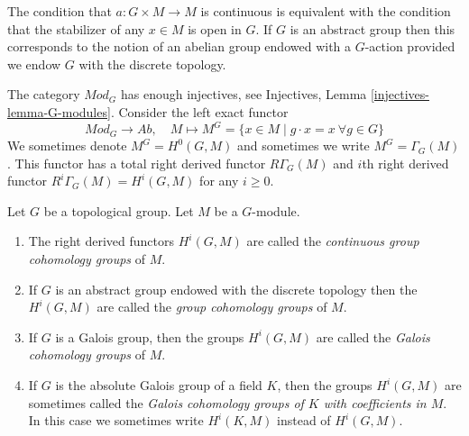 \noindent
The condition that $a : G \times M \to M$ is continuous is equivalent
with the condition that the stabilizer of any  $x \in M$ is open in $G$.
If $G$ is an abstract group then this corresponds to the notion of an
abelian group endowed with a $G$-action provided we endow $G$ with the
discrete topology.

\medskip\noindent
The category $\textit{Mod}_G$ has enough injectives, see
Injectives, Lemma \ref{injectives-lemma-G-modules}.
Consider the left exact functor
$$
\textit{Mod}_G \longrightarrow \textit{Ab},
\quad
M \longmapsto M^G =
\{x \in M \mid g \cdot x = x\ \forall g \in G\}
$$
We sometimes denote $M^G = H^0(G, M)$ and sometimes we write
$M^G = \Gamma_G(M)$. This functor has a total right derived functor
$R\Gamma_G(M)$ and $i$th right derived functor
$R^i\Gamma_G(M) = H^i(G, M)$ for any $i \geq 0$.

\begin{definition}
\label{definition-galois-cohomology}
Let $G$ be a topological group. Let $M$ be a $G$-module.
\begin{enumerate}
\item The right derived functors $H^i(G, M)$ are called the
{\it continuous group cohomology groups} of $M$.
\item If $G$ is an abstract group endowed with the discrete topology
then the $H^i(G, M)$ are called the {\it group cohomology groups} of $M$.
\item If $G$ is a Galois group, then the groups $H^i(G, M)$ are called
the {\it Galois cohomology groups} of $M$.
\item If $G$ is the absolute Galois group of a field $K$, then the groups
$H^i(G, M)$ are sometimes called the {\it Galois cohomology groups of $K$
with coefficients in $M$}. In this case we sometimes write
$H^i(K, M)$ instead of $H^i(G, M)$.
\end{enumerate}
\end{definition}

